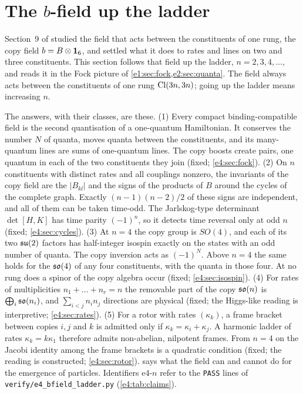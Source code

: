 \section{\texorpdfstring{The $b$-field up the ladder}{The b-field up the ladder}}
\label{e4:sec:main}

Section~9 of \cite{RE} studied the field that acts between the constituents of one rung, the copy field $b=B\otimes\mathbf 1_6$, and settled what it
does to rates and lines on two and three constituents. This section follows that field up the ladder, $n=2,3,4,\dots$, and reads it in
the Fock picture of \cref{e1:sec:fock,e2:sec:quanta}. The field always acts between the constituents of one rung $\mathrm{Cl}(3n,3n)$; going up the
ladder means increasing $n$.

The answers, with their classes, are these. (1) Every compact binding-compatible field is the second quantisation of a one-quantum
Hamiltonian. It conserves the number $N$ of quanta, moves quanta between the constituents, and its many-quantum lines are sums of
one-quantum lines. The copy boosts create pairs, one quantum in each of the two constituents they join (fixed; \cref{e4:sec:fock}). (2) On $n$
constituents with distinct rates and all couplings nonzero, the invariants of the copy field are the $|B_{kl}|$ and the signs of the
products of $B$ around the cycles of the complete graph. Exactly $(n-1)(n-2)/2$ of these signs are independent, and all of them can be taken
time-odd. The Jarlskog-type determinant $\det[H,K]$ has time parity $(-1)^n$, so it detects time reversal only at odd $n$ (fixed;
\cref{e4:sec:cycles}). (3) At $n=4$ the copy group is $SO(4)$, and each of its two $\mathfrak{su}(2)$ factors has half-integer isospin exactly on the states
with an odd number of quanta. The copy inversion acts as $(-1)^N$. Above $n=4$ the same holds for the $\mathfrak{so}(4)$ of any four constituents, with the
quanta in those four. At no rung does a spinor of the copy algebra occur (fixed; \cref{e4:sec:isospin}). (4) For rates of multiplicities $n_1+\dots+n_r=n$ the removable part of the copy $\mathfrak{so}(n)$ is $\bigoplus_i\mathfrak{so}(n_i)$, and
$\sum_{i<j}n_in_j$ directions are physical (fixed; the Higgs-like reading is interpretive; \cref{e4:sec:rates}). (5) For a rotor with rates
$(\kappa_k)$, a frame bracket between copies $i,j$ and $k$ is admitted only if $\kappa_k=\kappa_i+\kappa_j$. A harmonic ladder of rates
$\kappa_k=k\kappa_1$ therefore admits non-abelian, nilpotent frames. From $n=4$ on the Jacobi identity among the frame brackets is a
quadratic condition (fixed; the reading is constructed; \cref{e4:sec:rotor}).  says what the field can and cannot do for the emergence of particles.
Identifiers e4-$n$ refer to the \texttt{PASS} lines of \texttt{verify/e4\_bfield\_ladder.py} (\cref{e4:tab:claims}).

